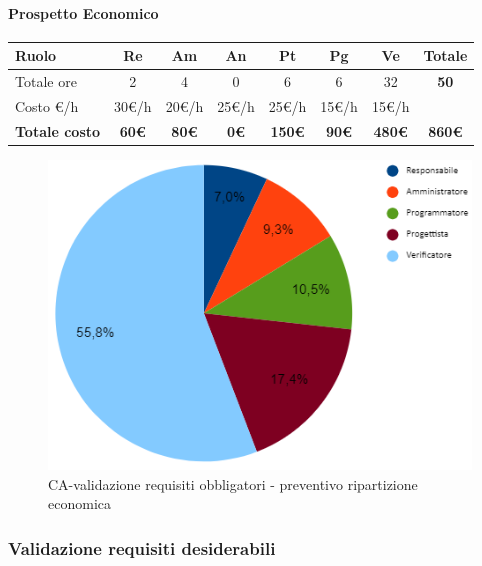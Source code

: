 \paragraph{Prospetto Economico}
\begin{center}
	\renewcommand{\arraystretch}{1.8} %
	\begin{tabular}{ |m{10em}|c|c|c|c|c|c|c| }
	\hline
	\textbf{Ruolo} & \textbf{Re} & \textbf{Am} &  \textbf{An} &  \textbf{Pt} &  \textbf{Pg} &  \textbf{Ve} &  \textbf{Totale}\\
    \hline
    Totale ore & 2 & 4 & 0 & 6 & 6 & 32 & \textbf{50}\\
    \hline
    Costo \euro/h & 30\euro/h & 20\euro/h & 25\euro/h & 25\euro/h & 15\euro/h & 15\euro/h & \\
    \hline
    \textbf{Totale costo} & \textbf{60\euro} & \textbf{80\euro} &  \textbf{0\euro} &  \textbf{150\euro} &  \textbf{90\euro} &  \textbf{480\euro} &  \textbf{860\euro}\\
    \hline
	\end{tabular}

\begin{figure}[H]
    \centering\includegraphics[scale=0.9]{images/preventivo/CA-obbligatori-costo.png}
    \caption{CA-validazione requisiti obbligatori - preventivo ripartizione economica}
\end{figure}
\end{center}

\newpage
\subsubsection{Validazione requisiti desiderabili}
